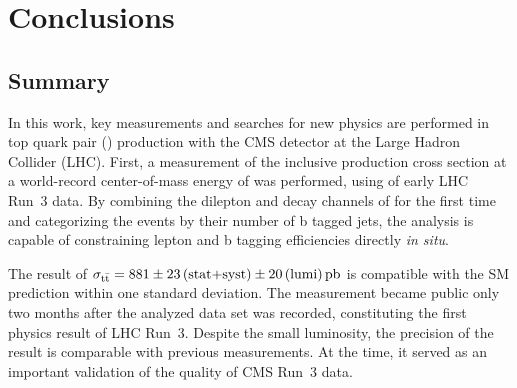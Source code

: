 \chapter{Conclusions}
\label{ch:summary}


\section{Summary}

In this work, key measurements and searches for new physics are performed in  top quark pair (\ttbar) production with the CMS detector at the Large Hadron Collider (LHC). First, a measurement of the inclusive \ttbar production cross section at a world-record center-of-mass energy of \sqrtsRIII was performed, using \lumiRIII of early LHC Run~3 data. By combining the dilepton and \ljets decay channels of \ttbar for the first time and categorizing the events by their number of b tagged jets, the analysis is capable of constraining lepton and b tagging efficiencies directly \textit{in situ}. 

The result of $\sigma_{\mathrm{t \bar{t}}} = 881 \pm 23 \, \text{(stat+syst)} \pm 20 \, \text{(lumi)} \, \text{pb}$ is compatible with the SM prediction within one standard deviation. The measurement became public only two months after the analyzed data set was recorded, constituting the first physics result of LHC Run~3. Despite the small luminosity, the precision of the result is comparable with previous \sigmatt measurements. At the time, it served as an important validation of the quality of CMS Run~3 data.


\smallskip

